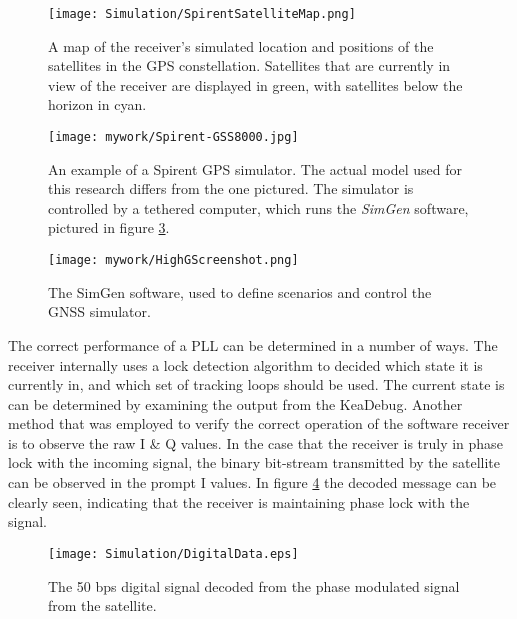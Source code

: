 \begin{figure}[!htb] 
    \centering
    \texttt{[image: Simulation/SpirentSatelliteMap.png]} 
    \caption{A map of the receiver's simulated location and positions of the satellites in the GPS constellation. Satellites that are currently in view of the receiver are displayed in green, with satellites below the horizon in cyan.}
    \label{fig:SpirentSatelliteMap}
\end{figure}



\begin{figure}[!htb] 
    \centering
    \texttt{[image: mywork/Spirent-GSS8000.jpg]} 
    \caption{An example of a Spirent \ac{GPS} simulator. The actual model used for this research differs from the one pictured. The simulator is controlled by a tethered computer, which runs the \emph{SimGen} software, pictured in figure \ref{:HighGScreenshot}.}
    \label{fig:Spirent}
\end{figure}

\begin{figure}[!htb] 
    \centering
    \texttt{[image: mywork/HighGScreenshot.png]} 
    \caption{The SimGen software, used to define scenarios and control the \ac{GNSS} simulator.}
    \label{:HighGScreenshot}
\end{figure}


The correct performance of a \ac{PLL} can be determined in a number of ways. The receiver internally uses a lock detection algorithm to decided which state it is currently in, and which set of tracking loops should be used. The current state is can be determined by examining the output from the KeaDebug. Another method that was employed to verify the correct operation of the software receiver is to observe the raw I \& Q values. In the case that the receiver is truly in phase lock with the incoming signal, the binary bit-stream transmitted by the satellite can be observed in the prompt I values. In figure \ref{fig:DigitalData} the decoded message can be clearly seen, indicating that the receiver is maintaining phase lock with the signal. 

\begin{figure}[!htb] 
    \centering
    \texttt{[image: Simulation/DigitalData.eps]} 
    \caption{The 50 bps digital signal decoded from the phase modulated signal from the satellite.}
    \label{fig:DigitalData}
\end{figure}



